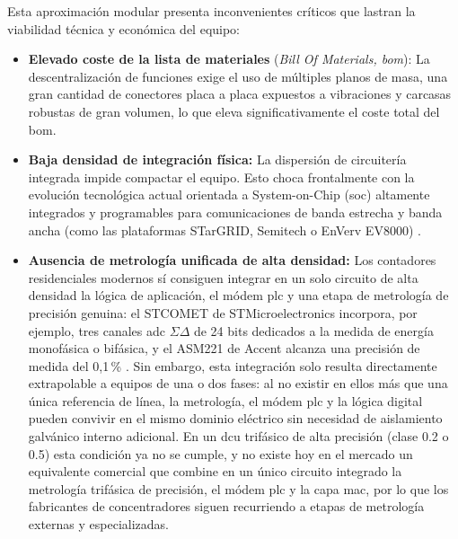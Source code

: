 Esta aproximación modular presenta inconvenientes críticos que lastran la viabilidad técnica y económica del equipo:
\begin{itemize}
    \item \textbf{Elevado coste de la lista de materiales} (\textit{Bill Of Materials, \gls{bom}}): La descentralización de funciones exige el uso de múltiples planos de masa, una gran cantidad de conectores placa a placa expuestos a vibraciones y carcasas robustas de gran volumen, lo que eleva significativamente el coste total del \gls{bom}.
    \item \textbf{Baja densidad de integración física:} La dispersión de circuitería integrada impide compactar el equipo. Esto choca frontalmente con la evolución tecnológica actual orientada a System-on-Chip (\gls{soc}) altamente integrados y programables para comunicaciones de banda estrecha y banda ancha (como las plataformas STarGRID, Semitech o EnVerv EV8000) \cite{SHARMA2017704}.
    \item \textbf{Ausencia de metrología unificada de alta densidad:} Los contadores residenciales modernos sí consiguen integrar en un solo circuito de alta densidad la lógica de aplicación, el módem \gls{plc} y una etapa de metrología de precisión genuina: el STCOMET de STMicroelectronics incorpora, por ejemplo, tres canales \gls{adc} $\Sigma\Delta$ de 24 bits dedicados a la medida de energía monofásica o bifásica, y el ASM221 de Accent alcanza una precisión de medida del 0,1\,\% \cite{SHARMA2017704}. Sin embargo, esta integración solo resulta directamente extrapolable a equipos de una o dos fases: al no existir en ellos más que una única referencia de línea, la metrología, el módem \gls{plc} y la lógica digital pueden convivir en el mismo dominio eléctrico sin necesidad de aislamiento galvánico interno adicional. En un \gls{dcu} trifásico de alta precisión (clase 0.2 o 0.5) esta condición ya no se cumple, y no existe hoy en el mercado un equivalente comercial que combine en un único circuito integrado la metrología trifásica de precisión, el módem \gls{plc} y la capa \gls{mac}, por lo que los fabricantes de concentradores siguen recurriendo a etapas de metrología externas y especializadas.
\end{itemize}

